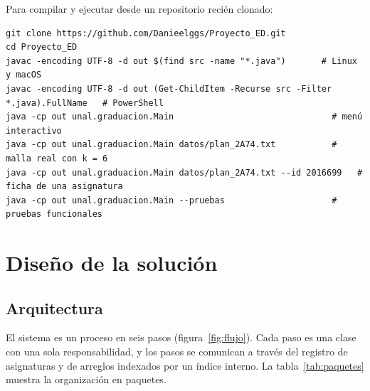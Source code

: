 \documentclass[11pt,letterpaper]{article}
\begin{document}
Para compilar y ejecutar desde un repositorio recién clonado:
\begin{lstlisting}[style=consola]
git clone https://github.com/Danieelggs/Proyecto_ED.git
cd Proyecto_ED
javac -encoding UTF-8 -d out $(find src -name "*.java")       # Linux y macOS
javac -encoding UTF-8 -d out (Get-ChildItem -Recurse src -Filter *.java).FullName   # PowerShell
java -cp out unal.graduacion.Main                               # menú interactivo
java -cp out unal.graduacion.Main datos/plan_2A74.txt           # malla real con k = 6
java -cp out unal.graduacion.Main datos/plan_2A74.txt --id 2016699   # ficha de una asignatura
java -cp out unal.graduacion.Main --pruebas                     # pruebas funcionales
\end{lstlisting}

\section{Diseño de la solución}\label{sec:diseno}

\subsection{Arquitectura}
El sistema es un proceso en seis pasos (figura~\ref{fig:flujo}). Cada paso es una clase con una sola responsabilidad, y los pasos se comunican a través del registro de asignaturas y de arreglos indexados por un índice interno. La tabla~\ref{tab:paquetes} muestra la organización en paquetes.
\end{document}
